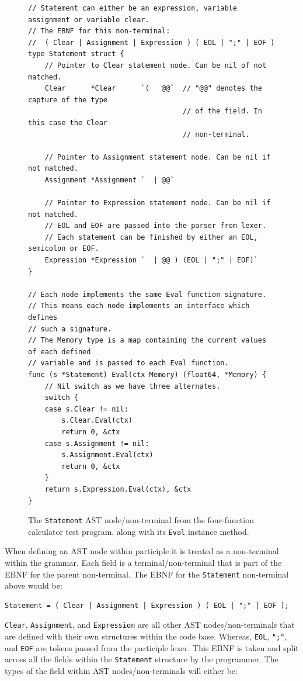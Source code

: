 \documentclass[]{full}
\theoremstyle{definition}
\begin{document}
\begin{figure}[H]
    \begin{verbatim}
// Statement can either be an expression, variable assignment or variable clear.
// The EBNF for this non-terminal:
//  ( Clear | Assignment | Expression ) ( EOL | ";" | EOF )
type Statement struct {
    // Pointer to Clear statement node. Can be nil of not matched.
    Clear      *Clear      `(   @@`  // "@@" denotes the capture of the type 
                                     // of the field. In this case the Clear
                                     // non-terminal.

    // Pointer to Assignment statement node. Can be nil if not matched.
    Assignment *Assignment `  | @@`

    // Pointer to Expression statement node. Can be nil if not matched.
    // EOL and EOF are passed into the parser from lexer.
    // Each statement can be finished by either an EOL, semicolon or EOF.
    Expression *Expression `  | @@ ) (EOL | ";" | EOF)`
}

// Each node implements the same Eval function signature.
// This means each node implements an interface which defines
// such a signature.
// The Memory type is a map containing the current values of each defined
// variable and is passed to each Eval function.
func (s *Statement) Eval(ctx Memory) (float64, *Memory) {
    // Nil switch as we have three alternates.
    switch {
    case s.Clear != nil:
        s.Clear.Eval(ctx)
        return 0, &ctx
    case s.Assignment != nil:
        s.Assignment.Eval(ctx)
        return 0, &ctx
    }
    return s.Expression.Eval(ctx), &ctx
}
    \end{verbatim}
    \label{fig:four-func-calc-statement-ast-node}
    \cprotect\caption{The \verb|Statement| AST node/non-terminal from the four-function calculator test program, along with its \verb|Eval| instance method.}
\end{figure}

When defining an AST node within participle it is treated as a non-terminal within the grammar. Each field is a terminal/non-terminal that is part of the EBNF for the parent non-terminal. The EBNF for the \verb|Statement| non-terminal above would be:

\begin{verbatim}
Statement = ( Clear | Assignment | Expression ) ( EOL | ";" | EOF );
\end{verbatim}

\verb|Clear|, \verb|Assignment|, and \verb|Expression| are all other AST nodes/non-terminals that are defined with their own structures within the code base. Whereas, \verb|EOL|, \verb|";"|, and \verb|EOF| are tokens passed from the participle lexer. This EBNF is taken and split across all the fields within the \verb|Statement| structure by the programmer. The types of the field within AST nodes/non-terminals will either be:
\end{document}
